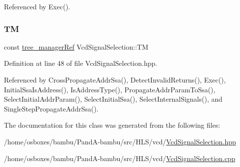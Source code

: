 Referenced by Exec().

\mbox{\label{classVcdSignalSelection_a15ef09f9d7db919e05d546dfb90b5d6a}} 
\subsubsection{\texorpdfstring{TM}{TM}}
{\footnotesize\ttfamily const \hyperlink{tree__manager_8hpp_a96ff150c071ce11a9a7a1e40590f205e}{tree\+\_\+manager\+Ref} Vcd\+Signal\+Selection\+::\+TM\hspace{0.3cm}{\ttfamily [protected]}}



Definition at line 48 of file Vcd\+Signal\+Selection.\+hpp.



Referenced by Cross\+Propagate\+Addr\+Ssa(), Detect\+Invalid\+Returns(), Exec(), Initial\+Ssa\+Is\+Address(), Is\+Address\+Type(), Propagate\+Addr\+Param\+To\+Ssa(), Select\+Initial\+Addr\+Param(), Select\+Initial\+Ssa(), Select\+Internal\+Signals(), and Single\+Step\+Propagate\+Addr\+Ssa().



The documentation for this class was generated from the following files\+:\begin{DoxyCompactItemize}
\item 
/home/osboxes/bambu/\+Pand\+A-\/bambu/src/\+H\+L\+S/vcd/\hyperlink{VcdSignalSelection_8hpp}{Vcd\+Signal\+Selection.\+hpp}\item 
/home/osboxes/bambu/\+Pand\+A-\/bambu/src/\+H\+L\+S/vcd/\hyperlink{VcdSignalSelection_8cpp}{Vcd\+Signal\+Selection.\+cpp}\end{DoxyCompactItemize}

